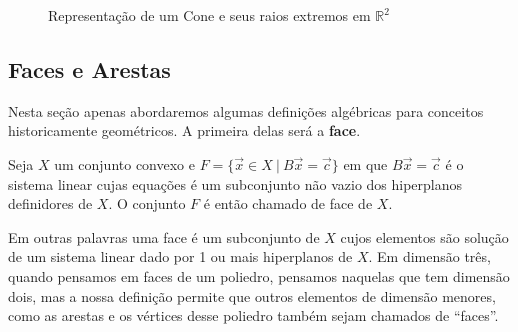 \begin{figure}[H]
\centering
{}
\caption{Representação de um Cone e seus raios extremos em \(\mathbb{R}^2\)}

\label{fig:cone}
\end{figure}

\subsection{Faces e Arestas}

Nesta seção apenas abordaremos algumas definições algébricas para conceitos historicamente geométricos. A primeira delas será a \textbf{face}.

\begin{def:face}
	Seja $X$ um conjunto convexo e $F = \{\vec{x} \in X\ |\ B\vec{x} = \vec{c}\}$ em que $B\vec{x} = \vec{c}$ é o sistema linear cujas equações é um subconjunto não vazio dos hiperplanos definidores de $X$. O conjunto $F$ é então chamado de face de $X$. 
\end{def:face}

Em outras palavras uma face é um subconjunto de $X$ cujos elementos são solução de um sistema linear dado por 1 ou mais hiperplanos de $X$. Em dimensão três, quando pensamos em faces de um poliedro, pensamos naquelas que tem dimensão dois, mas a nossa definição permite que outros elementos de dimensão menores, como as arestas e os vértices desse poliedro também sejam chamados de ``faces''. 

